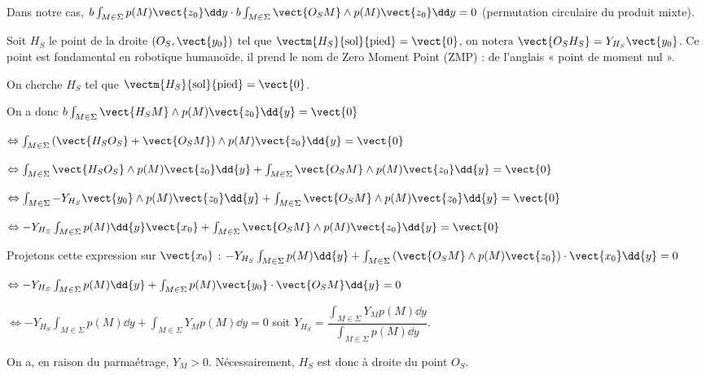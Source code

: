 \begin{multicols}{2}
\begin{corrige}
Dans notre cas, $b\int_{M\in\Sigma} p(M)\vect{z_0} \dd y \cdot b\int_{M\in\Sigma} \vect{O_S M} \wedge p(M)\vect{z_0} \dd y = 0$ (permutation circulaire du produit mixte). 


 
\end{corrige}
\else
\fi

\ifprof
\else

Soit $H_S$ le point de la droite $\left(O_S,\vect{y_0}\right)$ tel que  
$\vectm{H_S}{\text{sol}}{\text{pied}}=\vect{0}$, on notera $\vect{O_SH_S} = Y_{H_S}\vect{y_0}$. Ce point est
fondamental en robotique humanoïde, il prend le nom de Zero Moment Point (ZMP) : de l'anglais « point de
moment nul ».

\fi


\ifprof
\begin{corrige}
On cherche $H_S$  tel que $ \vectm{H_S}{\text{sol}}{\text{pied}} =\vect{0}$.


On a donc $ b \int_{M\in\Sigma} \vect{H_S M} \wedge p(M)\vect{z_0} \dd {y}= \vect{0}$

$ \Leftrightarrow \int_{M\in\Sigma}\left( \vect{H_S O_S}+\vect{O_S M} \right)\wedge p(M)\vect{z_0} \dd {y}= \vect{0}$


$ \Leftrightarrow \int_{M\in\Sigma} \vect{H_S O_S}\wedge p(M)\vect{z_0} \dd {y} +\int_{M\in\Sigma}\vect{O_S M}\wedge p(M)\vect{z_0} \dd {y}  = \vect{0}$


$ \Leftrightarrow \int_{M\in\Sigma} -Y_{H_S}\vect{y_0}\wedge p(M)\vect{z_0} \dd {y} +\int_{M\in\Sigma}\vect{O_S M}\wedge p(M)\vect{z_0} \dd {y}  = \vect{0}$


$ \Leftrightarrow -Y_{H_S}\int_{M\in\Sigma}  p(M) \dd {y}\vect{x_0} +\int_{M\in\Sigma}\vect{O_S M}\wedge p(M)\vect{z_0} \dd {y}  = \vect{0}$

Projetons cette expression sur $\vect{x_0}$ :
$  -Y_{H_S}\int_{M\in\Sigma}  p(M) \dd {y} +\int_{M\in\Sigma}\left(\vect{O_S M}\wedge p(M)\vect{z_0}\right)\cdot \vect{x_0} \dd {y}  = {0}$

$  \Leftrightarrow -Y_{H_S}\int_{M\in\Sigma}  p(M) \dd {y} +\int_{M\in\Sigma}p(M)\vect{y_0}\cdot \vect{O_S M} \dd {y}  = {0}$

$  \Leftrightarrow -Y_{H_S}\int_{M\in\Sigma}  p(M) \dd {y} +\int_{M\in\Sigma} Y_Mp(M) \dd {y}  = {0}$ soit 
$  Y_{H_S}  = \dfrac{\int_{M\in\Sigma} Y_Mp(M) \dd {y}}{\int_{M\in\Sigma}  p(M) \dd {y}}  $.

On a, en raison du parmaétrage, $Y_M > 0$. 
Nécessairement, $H_S$ est donc à droite du point $O_S$. 



\end{corrige}
\end{multicols}
